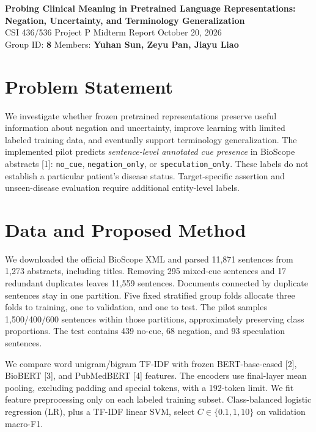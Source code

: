 \documentclass[10pt,letterpaper]{article}
\begin{document}
\begin{center}
{\large\bfseries Probing Clinical Meaning in Pretrained Language Representations:\\
Negation, Uncertainty, and Terminology Generalization}\\[3pt]
{\small CSI 436/536 Project P \quad Midterm Report \quad October 20, 2026}\\
{\small Group ID: \textbf{8} \quad Members: \textbf{Yuhan Sun, Zeyu Pan, Jiayu Liao}}
\end{center}
\vspace{-6pt}
\section{Problem Statement}
We investigate whether frozen pretrained representations preserve useful information
about negation and uncertainty, improve learning with limited labeled training data,
and eventually support terminology generalization. The implemented pilot predicts
\emph{sentence-level annotated cue presence} in BioScope abstracts [1]:
\texttt{no\_cue}, \texttt{negation\_only}, or \texttt{speculation\_only}.
These labels do not establish a particular patient's disease status. Target-specific
assertion and unseen-disease evaluation require additional entity-level labels.
\section{Data and Proposed Method}
We downloaded the official BioScope XML and parsed 11,871 sentences from 1,273 abstracts,
including titles. Removing 295 mixed-cue sentences and 17 redundant duplicates leaves
11,559 sentences. Documents connected by duplicate sentences stay in one partition.
Five fixed stratified group folds allocate three folds to training, one to validation,
and one to test. The pilot samples 1,500/400/600 sentences within those partitions,
approximately preserving class proportions. The test contains 439 no-cue, 68 negation,
and 93 speculation sentences.

We compare word unigram/bigram TF-IDF with frozen BERT-base-cased [2], BioBERT [3],
and PubMedBERT [4] features. The encoders use final-layer mean pooling,
excluding padding and special tokens, with a 192-token limit. We fit feature
preprocessing only on each labeled training subset. Class-balanced logistic regression
(LR), plus a TF-IDF linear SVM, select $C\in\{0.1,1,10\}$ on validation macro-F1.
\end{document}
